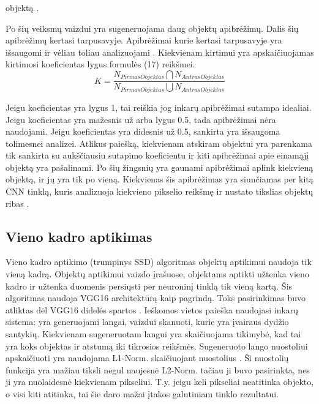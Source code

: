 \documentclass{VUMIFInfKursinis}
\begin{document}
objektą \cite{salt15}.
\par
Po šių veiksmų vaizdui yra sugeneruojama daug objektų apibrėžimų. Dalis šių apibrėžimų
kertasi tarpusavyje. Apibrėžimai kurie kertasi tarpusavyje yra išsaugomi ir vėliau
toliau analizuojami \cite{salt15}. Kiekvienam kirtimui yra apskaičiuojamas kirtimosi koeficientas lygus formulės (17) reikšmei.
\begin{equation}
  K = \frac{N_{PirmasObjektas} \bigcap N_{AntrasObjektas}}{N_{PirmasObjektas} \bigcup N_{AntrasObjektas}}
\end{equation}
\par
Jeigu koeficientas yra lygus 1, tai reiškia jog inkarų apibrėžimai sutampa idealiai.
Jeigu koeficientas yra mažesnis už arba lygus 0.5, tada apibrėžimai nėra naudojami.
Jeigu koeficientas yra didesnis už 0.5, sankirta yra išsaugoma tolimesnei analizei.
Atlikus paiešką, kiekvienam atskiram objektui yra parenkama tik sankirta su aukščiausiu
sutapimo koeficientu ir kiti apibrėžimai apie einamąjį objektą yra pašalinami.
Po šių žingsnių yra gaunami apibrėžimai aplink kiekvieną objektą, ir jų yra tik po
vieną. Kiekvienas šis apibrėžimas yra siunčiamas per kitą CNN tinklą, kuris analizuoja
kiekvieno pikselio reikšmę ir nustato tikslias objektų ribas \cite{salt15}.

\subsection{Vieno kadro aptikimas}
\par
Vieno kadro aptikimo (trumpinys SSD) algoritmas objektų aptikimui naudoja tik vieną kadrą.
Objektų aptikimui vaizdo įrašuose, objektams aptikti užtenka vieno kadro ir užtenka
duomenis persiųsti per neuroninį tinklą tik vieną kartą. Šis algoritmas
naudoja VGG16 architektūrą kaip pagrindą. Toks pasirinkimas buvo atliktas dėl VGG16
didelės spartos \cite{salt20}. Ieškomos vietos paieška naudojasi inkarų sistema:
yra generuojami langai, vaizdui skanuoti, kurie yra įvairaus dydžio santykių.
Kiekvienam sugeneruotam langui yra skaičiuojama tikimybė, kad tai yra koks objektas
ir atstumą iki tikrosios reikšmės. Sugeneruoto lango nuostoliui apskaičiuoti
yra naudojama L1-Norm. skaičiuojant nuostolius \cite{salt20}. Ši nuostolių funkcija
yra mažiau tiksli negul naujesnė L2-Norm. tačiau ji buvo pasirinkta, nes ji yra nuolaidesnė
kiekvienam pikseliui. T.y. jeigu keli pikseliai neatitinka objekto, o visi kiti atitinka,
tai šie daro mažai įtakos galutiniam tinklo rezultatui.
\end{document}
